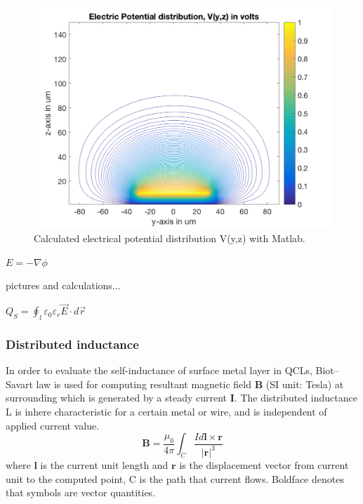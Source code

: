 \documentclass[11pt,final]{scrbook}
\begin{document}
\begin{figure}[htbp]
\begin{center}
\includegraphics[scale=0.3]{images/TL_C.pdf}
\caption{Calculated electrical potential distribution V(y,z) with Matlab.}
\label{fig:TL_C}
\end{center}
\end{figure}

$E=-\nabla \phi$

pictures and calculations...

${ Q }_{ S }=\oint _{ l }{\varepsilon_{0}\varepsilon_{r}\overrightarrow { E } \cdot d\overrightarrow { r } } $
\subsubsection{Distributed inductance}
In order to evaluate the self-inductance of surface metal layer in QCLs, Biot–Savart law \cite{grant2013electromagnetism} is used for computing resultant magnetic field $\textbf{B}$ (SI unit: Tesla) at surrounding which is generated by a steady current $\textbf{I}$. The distributed inductance L is inhere characteristic for a certain metal or wire, and is independent of applied current value.  
\begin{equation}
\textbf{B}=\frac{\mu_{0}}{4\pi}\int _{ C }{ \frac { Id\textbf{l}\times \textbf{r} }{ |\textbf{r}| ^{3}}}
\end{equation}
where $\textbf{l}$ is the current unit length and $\textbf{r}$ is the displacement vector from current unit to the computed point, C is the path that current flows. Boldface denotes that symbols are vector quantities.
\end{document}
